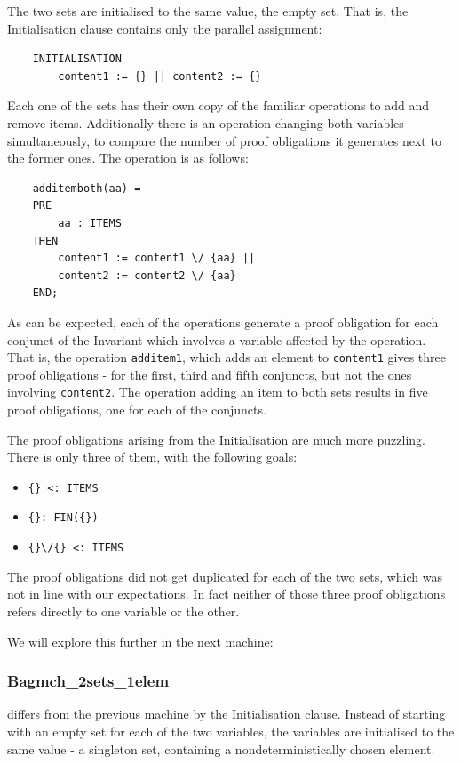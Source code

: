 \documentclass[11pt,journal]{IEEEtran}
\begin{document}
	The two sets are initialised to the same value, the empty set. That is, the Initialisation clause contains only the parallel assignment: 
	\begin{lstlisting}
	INITIALISATION
		content1 := {} || content2 := {}
	\end{lstlisting}
	
	Each one of the sets has their own copy of the familiar operations to add and remove items. Additionally there is an operation changing both variables simultaneously, to compare the number of proof obligations it generates next to the former ones. The operation is as follows:
	
	\begin{lstlisting}
	additemboth(aa) =
	PRE
		aa : ITEMS
	THEN
		content1 := content1 \/ {aa} ||
		content2 := content2 \/ {aa}
	END;
	\end{lstlisting}
	
	As can be expected, each of the operations generate a proof obligation for each conjunct of the Invariant which involves a variable affected by the operation. That is, the operation \texttt{additem1}, which adds an element to \texttt{content1} gives three proof obligations - for the first, third and fifth conjuncts, but not the ones involving \texttt{content2}. The operation adding an item to both sets results in five proof obligations, one for each of the conjuncts.
	
	The proof obligations arising from the Initialisation are much more puzzling. There is only three of them, with the following goals:
	\begin{itemize}
		\item \verb|{} <: ITEMS |
		\item \verb|{}: FIN({}) |
		\item \verb|{}\/{} <: ITEMS|
	\end{itemize}
	The proof obligations did not get duplicated for each of the two sets, which was not in line with our expectations. In fact neither of those three proof obligations refers directly to one variable or the other. 
	
	We will explore this further in the next machine:
	
	\subsubsection{Bagmch\_2sets\_1elem} differs from the previous machine by the Initialisation clause. Instead of starting with an empty set for each of the two variables, the variables are initialised to the same value - a singleton set, containing a nondeterministically chosen element. 
	
\end{document}

